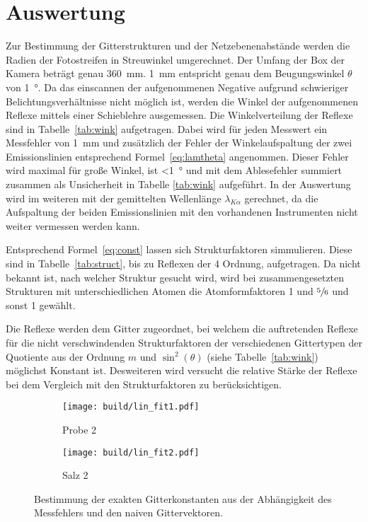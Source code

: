 \section{Auswertung}\label{sec:Auswertung}

Zur Bestimmung der Gitterstrukturen und der Netzebenenabstände werden die
Radien der Fotostreifen in Streuwinkel umgerechnet.
Der Umfang der Box der Kamera beträgt genau \SI{360}{\milli\meter}.
\SI{1}{\milli\meter} entspricht genau dem Beugungswinkel $\theta$ von
\SI{1}{\degree}.
Da das einscannen der aufgenommenen Negative aufgrund schwieriger
Belichtungsverhältnisse nicht möglich ist, werden die Winkel der aufgenommenen
Reflexe mittels einer Schieblehre ausgemessen.
Die Winkelverteilung der Reflexe sind in Tabelle~\ref{tab:wink} aufgetragen.
Dabei wird für jeden Messwert ein Messfehler von \SI{1}{\milli\meter} und
zusätzlich der Fehler der Winkelaufspaltung der zwei Emissionslinien
entsprechend Formel~\ref{eq:lamtheta} angenommen.
Dieser Fehler wird maximal für große Winkel, ist \SI{<1}{\degree} und mit dem
Ablesefehler summiert zusammen als Unsicherheit in Tabelle \ref{tab:wink}
aufgeführt.
In der Auswertung wird im weiteren mit der gemittelten Wellenlänge
$\lambda_{K\alpha}$ gerechnet, da die Aufspaltung der beiden Emissionslinien 
mit den vorhandenen Instrumenten nicht weiter vermessen werden kann.

Entsprechend Formel~\eqref{eq:const} lassen sich Strukturfaktoren simmulieren.
Diese sind in Tabelle~\ref{tab:struct}, bis zu Reflexen der 4 Ordnung, aufgetragen.
Da nicht bekannt ist, nach welcher Struktur gesucht wird, wird bei
zusammengesetzten Strukturen mit unterschiedlichen Atomen die Atomformfaktoren
1 und $\sfrac{5}{6}$ und sonst 1 gewählt.

Die Reflexe werden dem Gitter zugeordnet, bei welchem die auftretenden Reflexe für
die nicht verschwindenden Strukturfaktoren der verschiedenen Gittertypen der
Quotiente aus der Ordnung $m$ und $\sin^2(\theta)$ (siehe Tabelle~\ref{tab:wink})
möglichst Konstant ist.
Desweiteren wird versucht die relative Stärke der Reflexe bei dem Vergleich mit den
Strukturfaktoren zu berücksichtigen.

\begin{figure}[ht]
		\centering
		\begin{subfigure}{0.49\textwidth}
				\centering
				\texttt{[image: build/lin\_fit1.pdf]}
				\caption{Probe 2}
				\label{fig:prb1}
		\end{subfigure}
		\begin{subfigure}{0.49\textwidth}
				\centering
				\texttt{[image: build/lin\_fit2.pdf]}
				\caption{Salz 2}
				\label{fig:prb1}
		\end{subfigure}
		\caption{Bestimmung der exakten Gitterkonstanten aus der Abhängigkeit
		des	Messfehlers und den naiven Gittervektoren.}
\end{figure}

